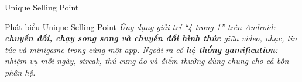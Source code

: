 \begin{frame}{Unique Selling Point}
\vspace{2mm}
\begin{exampleblock}{Phát biểu Unique Selling Point}
\small\itshape
Ứng dụng giải trí ``4 trong 1'' trên Android: \textbf{chuyển đổi, chạy song song và chuyển đổi hình thức} giữa video, nhạc, tin tức và minigame trong cùng một app. Ngoài ra có \textbf{hệ thống gamification}: nhiệm vụ mỗi ngày, streak, thú cưng ảo và điểm thưởng dùng chung cho cả bốn phân hệ.
\end{exampleblock}
\vspace{4mm}
\end{frame}
